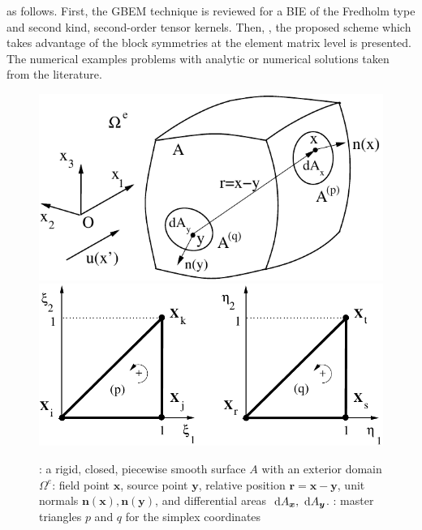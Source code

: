 \documentclass[oneside,onecolumn,10pt,final]{asme2ej}
\newcounter{tema}
\begin{document}
\noindent
{} as follows. First, the GBEM
technique is reviewed for a BIE of the Fredholm type and
second kind,  second-order 
tensor kernels. %
%
Then, ,
the proposed scheme which takes advantage
of the block symmetries at the element matrix level
is presented.
%
The numerical examples  problems with
analytic or numerical solutions taken from the literature.
%
\begin{figure}[t]
 {\centerline{%
  \includegraphics[width=6.5truecm]{./FIG/notatio5-gbem}
  \hspace{40pt}%
  \includegraphics[width=8.0truecm]{./FIG/m-master1}
}}{}%
 {\centerline{%
} \vspace{5pt} \centerline{%
}}{}%
\caption{: a rigid, closed, piecewise
  smooth surface $A$ with an exterior domain $\Omega^e$: %
  field point $\bm {x}$, source point $\bm {y}$, %
  relative position $\bm {r}=\bm {x}-\bm {y}$, %
  unit normals $\bm {n}(\bm {x}), \bm {n}(\bm {y})$,
  and differential areas ${~\mathrm{d}} A_{\bm {x}}, {~\mathrm{d}} A_{\bm {y}}$.
  : master triangles $p$ and $q$ for the simplex
  coordinates}%
\label{fg-notation-gbem}
\end{figure}
\end{document}
